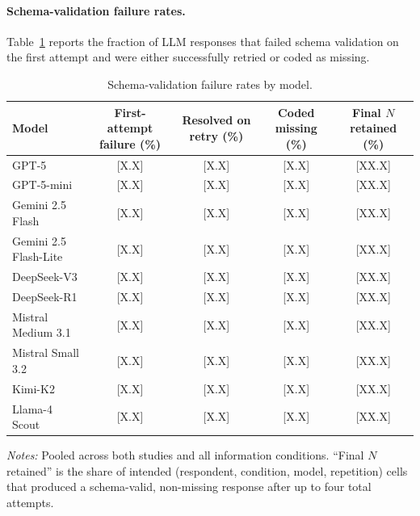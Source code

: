\documentclass[12pt]{article}
\begin{document}
\paragraph{Schema-validation failure rates.} Table~\ref{tab:validation-rates} reports the fraction of LLM responses that failed schema validation on the first attempt and were either successfully retried or coded as missing.

\begin{table}[h]
    \centering
    \caption{Schema-validation failure rates by model.}
    \label{tab:validation-rates}
    \begin{threeparttable}
    \begin{tabular}{lcccc}
        \toprule
        Model & First-attempt failure (\%) & Resolved on retry (\%) & Coded missing (\%) & Final $N$ retained (\%) \\
        \midrule
        GPT-5                  & [X.X] & [X.X] & [X.X] & [XX.X] \\
        GPT-5-mini             & [X.X] & [X.X] & [X.X] & [XX.X] \\
        Gemini 2.5 Flash       & [X.X] & [X.X] & [X.X] & [XX.X] \\
        Gemini 2.5 Flash-Lite  & [X.X] & [X.X] & [X.X] & [XX.X] \\
        DeepSeek-V3            & [X.X] & [X.X] & [X.X] & [XX.X] \\
        DeepSeek-R1            & [X.X] & [X.X] & [X.X] & [XX.X] \\
        Mistral Medium 3.1     & [X.X] & [X.X] & [X.X] & [XX.X] \\
        Mistral Small 3.2      & [X.X] & [X.X] & [X.X] & [XX.X] \\
        Kimi-K2                & [X.X] & [X.X] & [X.X] & [XX.X] \\
        Llama-4 Scout          & [X.X] & [X.X] & [X.X] & [XX.X] \\
        \bottomrule
    \end{tabular}
    \begin{tablenotes}\footnotesize
        \item \textit{Notes:} Pooled across both studies and all information conditions. ``Final $N$ retained'' is the share of intended (respondent, condition, model, repetition) cells that produced a schema-valid, non-missing response after up to four total attempts.
    \end{tablenotes}
    \end{threeparttable}
\end{table}
\end{document}
